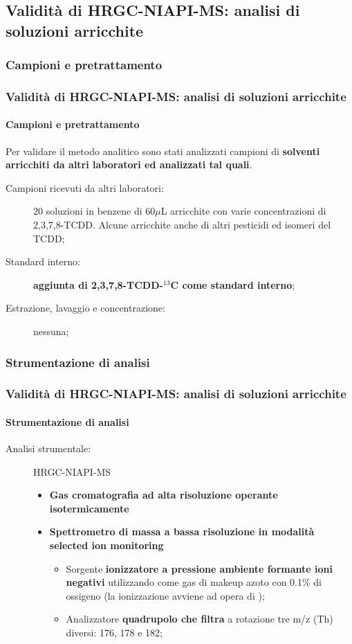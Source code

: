 \subsection{Validità di HRGC-NIAPI-MS: analisi di soluzioni arricchite}\subsubsection{Campioni e pretrattamento}\begin{frame}\frametitle{Validità di HRGC-NIAPI-MS: analisi di soluzioni arricchite}\framesubtitle{Campioni e pretrattamento}

Per validare il metodo analitico sono stati analizzati campioni di  {\bf solventi arricchiti da altri laboratori ed analizzati tal quali}.\pause
\begin{description}
\item [{Campioni ricevuti da altri laboratori:}] 20 soluzioni in benzene di 60$\mu$L arricchite con varie concentrazioni di 2,3,7,8-TCDD. Alcune arricchite anche di altri pesticidi ed isomeri del TCDD;
\item [{Standard interno:}]  {\bf aggiunta di 2,3,7,8-TCDD-$^{13}$C come standard interno};
\item [{Estrazione, lavaggio e concentrazione:}] nessuna;

\end{description}



\end{frame}\subsubsection{Strumentazione di analisi}\begin{frame}\frametitle{Validità di HRGC-NIAPI-MS: analisi di soluzioni arricchite}\framesubtitle{Strumentazione di analisi}
\begin{description}

\item [{Analisi strumentale:}] HRGC-NIAPI-MS \begin{itemize}\pause
                                              \item  {\bf Gas cromatografia ad alta risoluzione operante isotermicamente} 
                                              \item {\bf Spettrometro di massa a bassa risoluzione in modalità selected ion monitoring}
                                              \begin{itemize}
                                               \item Sorgente  {\bf ionizzatore a pressione ambiente formante ioni negativi} utilizzando come gas di makeup azoto con 0.1\% di ossigeno (la ionizzazione avviene ad opera di );
                                               \item Analizzatore  {\bf  quadrupolo che filtra} a rotazione tre m/z (Th) diversi: 176, 178 e 182;
                                              \end{itemize}
                                             \end{itemize} 


\end{description}
\end{frame}
